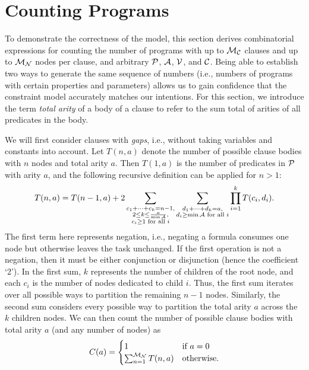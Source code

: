 \section{Counting Programs} \label{sec:counting}

To demonstrate the correctness of the model, this section derives combinatorial
expressions for counting the number of programs with up to $\mathcal{M}_{\mathcal{C}}{}$
clauses and up to $\mathcal{M}_{\mathcal{N}}{}$ nodes per clause, and arbitrary
$\mathcal{P}{}$, $\mathcal{A}{}$, $\mathcal{V}{}$, and $\mathcal{C}{}$. Being able to
establish two ways to generate the same sequence of numbers (i.e., numbers of
programs with certain properties and parameters) allows us to gain confidence
that the constraint model accurately matches our intentions. For this section,
we introduce the term \emph{total arity} of a body of a clause to refer to the
sum total of arities of all predicates in the body.

We will first consider clauses with \emph{gaps}, i.e., without taking variables
and constants into account. Let $T(n, a)$ denote the number of possible clause
bodies with $n$ nodes and total arity $a$. Then $T(1, a)$ is the number of
predicates in $\mathcal{P}{}$ with arity $a$, and the following recursive
definition can be applied for $n > 1$:
\[
  T(n, a) = T(n-1, a) + 2\sum_{\substack{c_1 + \dots + c_k = n - 1,\\ 2 \le k
      \le \frac{a}{\min \mathcal{A}{}},\\ c_i \ge 1 \text{ for all } i}}
  \sum_{\substack{d_1 + \dots + d_k = a,\\ d_i \ge \min \mathcal{A}{} \text{ for
        all } i}} \prod_{i=1}^k T(c_i, d_i).
\]
The first term here represents negation, i.e., negating a formula consumes
one node but otherwise leaves the task unchanged. If the first operation is not
a negation, then it must be either conjunction or disjunction (hence the
coefficient `2'). In the first sum, $k$ represents the number of children of the
root node, and each $c_i$ is the number of nodes dedicated to child $i$. Thus,
the first sum iterates over all possible ways to partition the remaining $n-1$
nodes. Similarly, the second sum considers every possible way to partition the
total arity $a$ across the $k$ children nodes. We can then count the number of
possible clause bodies with total arity $a$ (and any number of nodes) as
\[
  C(a) = \begin{cases}
    1 & \text{if } a = 0\\
    \sum_{n=1}^{\mathcal{M}_{\mathcal{N}}{}} T(n, a) & \text{otherwise.}
  \end{cases}
\]

